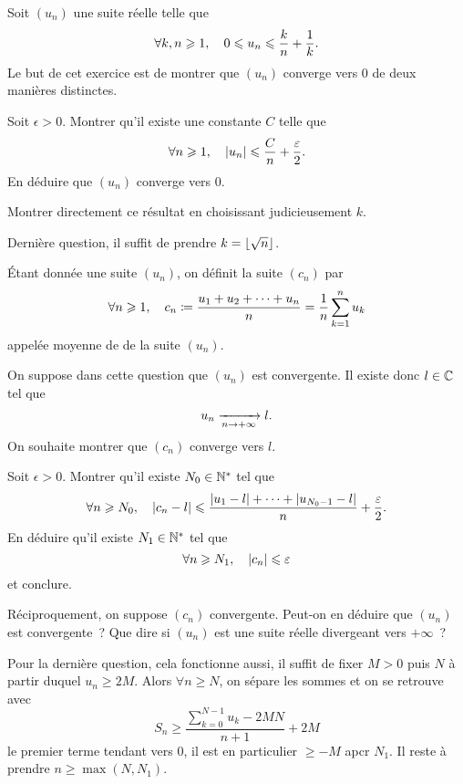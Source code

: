 \documentclass{magnolia}
\begin{document}
Soit $(u_n)$ une suite réelle telle que
\[\forall k,n \geqslant 1 ,\quad 0\leqslant u_n \leqslant  \frac{k}{n}+\frac{1}{k}.\]
Le but de cet exercice est de montrer que $(u_n)$ converge vers $0$ de deux
manières distinctes.
\begin{questions}
\question
  \begin{questions}
  \question Soit $\epsilon > 0$. Montrer qu'il existe une constante $C$
    telle que
    $$\forall n \geqslant 1 ,\quad |u_n|\leqslant \frac{C}{n} + \frac{\varepsilon}{2}.$$
  \question En déduire que $(u_n)$ converge vers $0$.
  \end{questions}
\question Montrer directement ce résultat en choisissant judicieusement $k$.
\end{questions}
\begin{sol}
Dernière question, il suffit de prendre $k=\left\lfloor\sqrt{n}\right\rfloor$.
\end{sol}

Étant donnée une suite $(u_n)$, on définit la suite $(c_n)$ par
\[\forall n \geqslant 1 ,\quad c_n\coloneqq\frac{u_1+u_2+\dots+u_n}{n}=\frac{1}{n}
  \sum_{k=1}^{n} u_k\]
appelée moyenne de  de la suite $(u_n)$. 
\begin{questions}
\question On suppose dans cette question que $(u_n)$ est convergente. Il existe donc
  $l\in\mathbb{C}$ tel que
  \[u_n\xrightarrow[n\rightarrow +\infty]{}l.\]
  On souhaite montrer que $(c_n)$ converge vers $l$.
  \begin{questions}
  \question Soit $\epsilon>0$. Montrer qu'il existe $N_0\in{\mathbb{N}^*}$ tel que
    \[\forall n \geqslant N_0 ,\quad \left|c_n-l\right|\leqslant \frac{\left|u_1-l\right|+\dots+\left|u_{N_0-1}-l\right|}{n} +
      \frac{\varepsilon}{2}.\]
  \question En déduire qu'il existe $N_1\in{\mathbb{N}^*}$ tel que
    \[\forall n \geqslant N_1 ,\quad |c_n|\leqslant \varepsilon\]
    et conclure.
  \end{questions}
\question Réciproquement, on suppose $(c_n)$ convergente. Peut-on en déduire que
  $(u_n)$ est convergente~?
\question Que dire si $(u_n)$ est une suite réelle divergeant vers $+\infty$~?
\end{questions}
\begin{sol}
Pour la dernière question, cela fonctionne aussi, il suffit de fixer $M>0$ puis $N$ à partir duquel $u_n\geq 2M$. Alors $\forall n\geq N$, on sépare les sommes et on se retrouve avec $$S_n \geq \frac{\sum_{k=0}^{N-1}u_k-2MN}{n+1}+2M$$ le premier terme tendant vers $0$, il est en particulier $\geq -M$ apcr $N_1$. Il reste à prendre $n\geq \max(N,N_1)$.
\end{sol}
\end{document}
